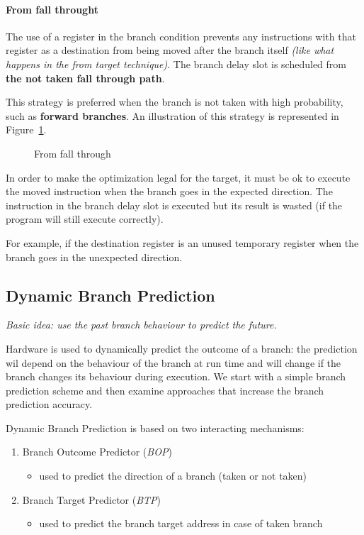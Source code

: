 \documentclass[english]{article}
\begin{document}
\paragraph{From fall throught}

The use of a register in the branch condition prevents any instructions with that register as a destination from being moved after the branch itself \textit{(like what happens in the from target technique)}.
The branch delay slot is scheduled from \textbf{the not taken fall through path}.

This strategy is preferred when the branch is not taken with high probability, such as \textbf{forward branches}.
An illustration of this strategy is represented in Figure~\ref{fig:from-fall-through}.

\begin{figure}[htbp]
  \bigskip
  \centering
  \caption{From fall through}
  \label{fig:from-fall-through}
  \bigskip
\end{figure}

In order to make the optimization legal for the target, it must be ok to execute the moved instruction when the branch goes in the expected direction.
The instruction in the branch delay slot is executed but its result is wasted (if the program will still execute correctly).

For example, if the destination register is an unused temporary register when the branch goes in the unexpected direction.

\subsection{Dynamic Branch Prediction}

\textit{Basic idea: use the past branch behaviour to predict the future.}

Hardware is used to dynamically predict the outcome of a branch: the prediction wil depend on the behaviour of the branch at run time and will change if the branch changes its behaviour during execution.
We start with a simple branch prediction scheme and then examine approaches that increase the branch prediction accuracy.

Dynamic Branch Prediction is based on two interacting mechanisms:

\begin{enumerate}
  \item Branch Outcome Predictor (\textit{BOP})
        \begin{itemize}
          \item used to predict the direction of a branch (taken or not taken)
        \end{itemize}
  \item Branch Target Predictor (\textit{BTP})
        \begin{itemize}
          \item used to predict the branch target address in case of taken branch
        \end{itemize}
\end{enumerate}
\end{document}
